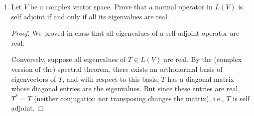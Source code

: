 \documentclass[11pt]{amsart}
\begin{document}
\begin{enumerate}[(1)]
\begin{proof}
Suppose $\v \in \null \left( T^k \right)$. Then
\begin{align*}
  0 
  &= \norm{ T^k(\v) }^2
  = \inner{ T^k(\v) }{ T^k(\v) }
  = \inner{ T^{k-1}(\v) }{ T^* T^k(\v) }
  = \inner{ T^{k-1}(\v) }{ T T^* T^{k-1}(\v) } \\
  &= \inner{ T^* T^{ k-1 } (\v) }{ T^* T^{ k-1 } (\v) } ,
\end{align*}
which implies that $T^* T^{ k-1 } (\v) = \0$. But then
\[
  0 = \inner{ T^* T^{ k-1 } (\v) }{ T^{ k-2 } (\v) }
  = \inner{ T^{ k-1 } (\v) }{ T^{ k-1 } (\v) } ,
\]
which implies, in turn, that $T^{ k-1 } (\v) = \0$, i.e., $\v \in \null \left( T^{ k-1 } \right)$.
We can repeat this proof to conclude that $\v \in \null \left( T^{ k-2 } \right)$, $\v \in \null \left( T^{ k-3 } \right)$, etc., and after a finite number of steps we conclude that $\v \in \null(T)$. This proves $\null \left( T^{ k-1 } \right) \subseteq \null(T)$.

Conversely, suppose $\v \in \null(T)$. Then $T^k(\v) = T^{ k-1 } (T(\v)) = T^{ k-1 } (\0) = \0$. This proves $\null(T) \subseteq \null \left( T^{ k-1 } \right)$.

To see that $\range \left( T^k \right) = \range \left( T \right)$, we note that $\range \left( T^k \right) \subseteq \range \left( T \right)$ (since $\v \in \range \left( T^k \right)$ means that there exists $\u \in V$ such that $T^k(\u) = \v$; but then $T\left( T^{ k-1 } (\u) \right) = \v$, i.e., $\v \in \range(T)$).
But these two subspaces have the same dimension:
\[
  \dim \range \left( T^k \right)
  = \dim V - \dim \null \left( T^k \right)
  = \dim V - \dim \null(T)
  = \dim \range(T) \, ,
\]
and thus $\range \left( T^k \right) = \range \left( T \right)$.
\end{proof}

\item Let $V$ be a complex vector space. Prove that a normal operator in $L(V)$ is self adjoint if and only if all its eigenvalues are real.

\begin{proof}
We proved in class that all eigenvalues of a self-adjoint operator are real.

Conversely, suppose all eigenvalues of $T \in L(V)$ are real. By the (complex version of the) spectral theorem, there exists an orthonormal basis of eigenvectors of $T$, and with respect to this basis, $T$ has a diagonal matrix whose diagonal entries are the eigenvalues. But since these entries are real, $T^* = T$ (neither conjugation nor transposing changes the matrix), i.e., $T$ is self adjoint.
\end{proof}


\end{enumerate}
\end{document}
